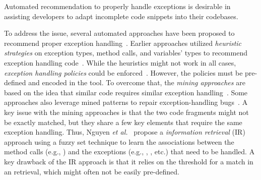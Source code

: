 \begin{Observation} 
Automated recommendation to properly handle exceptions is desirable in
assisting developers to adapt incomplete code snippets into their codebases.
\end{Observation}


To address the issue, several automated approaches have been proposed
to recommend proper exception
handling~\cite{xrank-fse20,barbosa-bsse12,chanchal-scam14,barbosa-tse18,barbosa-tse16}. Earlier
approaches utilized {\em heuristic strategies} on exception types,
method calls, and variables' types to recommend exception handling
code~\cite{barbosa-bsse12}. While the heuristics might not work in all
cases, {\em exception handling policies} could be
enforced~\cite{barbosa-tse16,barbosa-saner18}. However, the policies
must be pre-defined and encoded in the tool. To overcome that, the
{\em mining approaches} are based on the idea that similar code
requires similar exception handling~\cite{chanchal-scam14}. Some
approaches also leverage mined patterns to repair exception-handling
bugs~\cite{zhong-jss18}. A key issue with the mining approaches is
that the two code fragments might not be exactly matched, but they
share a few key elements that require the same exception handling.
Thus, Nguyen {\em et al.}~\cite{xrank-fse20} propose a {\em
  information retrieval} (IR) approach using a fuzzy set technique to
learn the associations between the method calls (e.g.,
) and the exceptions (e.g.,
, , etc.)
that need to be handled. A key drawback of the IR approach is that it
relies on the threshold for a match in an retrieval, which might often
not be easily pre-defined.





